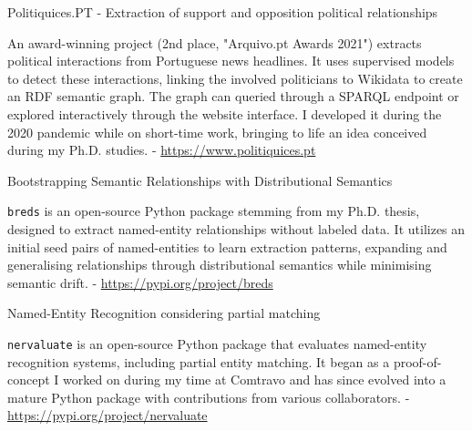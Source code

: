 
\begin{cventries}
  \cvproject
    {} %
	{Politiquices.PT - Extraction of support and opposition political relationships} %
    {} %
    {} %
    {
      \begin{cvitems} %
		  \item{An award-winning project (2nd place, "Arquivo.pt Awards 2021") extracts political interactions from Portuguese news headlines. It uses supervised models to detect these interactions, linking the involved politicians to Wikidata to create an RDF semantic graph. The graph can queried through a SPARQL endpoint or explored interactively through the website interface. I developed it during the 2020 pandemic while on short-time work, bringing to life an idea conceived during my Ph.D. studies. - \url{https://www.politiquices.pt}}
      \end{cvitems}
    }
\end{cventries}

\begin{cventries}
 \cvproject
   {} %
   {Bootstrapping Semantic Relationships with Distributional Semantics} %
   {} %
   {} %
   {
     \begin{cvitems} %
		\item {\texttt{breds} is an open-source Python package stemming from my Ph.D. thesis, designed to extract named-entity relationships without labeled data. It utilizes an initial seed pairs of named-entities to learn extraction patterns, expanding and generalising relationships through distributional semantics while minimising semantic drift. - \url{https://pypi.org/project/breds}}
     \end{cvitems}
   }
\end{cventries}

\begin{cventries}
 \cvproject
   {} %
   {Named-Entity Recognition considering partial matching} %
   {} %
   {} %
   {
     \begin{cvitems} %
     	\item {\texttt{nervaluate} is an open-source Python package that evaluates named-entity recognition systems, including partial entity matching. It began as a proof-of-concept I worked on during my time at Comtravo and has since evolved into a mature Python package with contributions from various collaborators. - \url{https://pypi.org/project/nervaluate}}
     \end{cvitems}
   }
\end{cventries}
